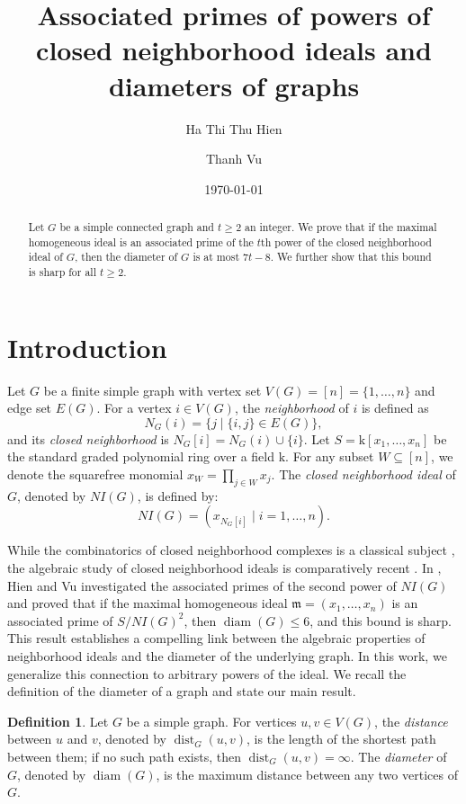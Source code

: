 \documentclass[12pt,reqno,twoside]{amsart}
\title{Associated primes of powers of closed neighborhood ideals and diameters of graphs}
\author{Ha Thi Thu Hien}
\author{Thanh Vu}
\date{\today}
\newcommand{\kk}{\mathrm k}
\theoremstyle{definition}
\newtheorem{defn}[thm]{\bf Definition}
\theoremstyle{plain}
\theoremstyle{remark}
\numberwithin{equation}{section}
\begin{document}
\begin{abstract} Let $G$ be a simple connected graph and $t \ge 2$ an integer. We prove that if the maximal homogeneous ideal is an associated prime of the $t$th power of the closed neighborhood ideal of $G$, then the diameter of $G$ is at most $7t - 8$. We further show that this bound is sharp for all $t \ge 2$.
\end{abstract}

\maketitle

\section{Introduction} 
Let $G$ be a finite simple graph with vertex set $V(G) = [n] = \{1, \ldots, n\}$ and edge set $E(G)$. For a vertex $i \in V(G)$, the \emph{neighborhood} of $i$ is defined as 
\[
N_G(i) = \{ j \mid \{i, j\} \in E(G) \},
\]
and its \emph{closed neighborhood} is $N_G[i] = N_G(i) \cup \{i\}$. Let $S = \kk[x_1, \ldots, x_n]$ be the standard graded polynomial ring over a field $\kk$. For any subset $W \subseteq [n]$, we denote the squarefree monomial $x_W = \prod_{j \in W} x_j$. The \emph{closed neighborhood ideal} of $G$, denoted by $NI(G)$, is defined by:
\[
NI(G) = ( x_{N_G[i]} \mid i = 1, \ldots, n ).
\]

While the combinatorics of closed neighborhood complexes is a classical subject \cite{B, L}, the algebraic study of closed neighborhood ideals is comparatively recent \cite{CJRS, SM, HS, NBR, NQ, NQBM}. In \cite{HV}, Hien and Vu investigated the associated primes of the second power of $NI(G)$ and  proved that if the maximal homogeneous ideal $\mathfrak{m} = (x_1, \ldots, x_n)$ is an associated prime of $S/NI(G)^2$, then $\operatorname{diam}(G) \le 6$, and this bound is sharp. This result establishes a compelling link between the algebraic properties of neighborhood ideals and the diameter of the underlying graph. In this work, we generalize this connection to arbitrary powers of the ideal. We recall the definition of the diameter of a graph and state our main result.


\begin{defn}
Let $G$ be a simple graph. For vertices $u, v \in V(G)$, the \emph{distance} between $u$ and $v$, denoted by $\operatorname{dist}_G(u, v)$, is the length of the shortest path between them; if no such path exists, then $\operatorname{dist}_G(u, v) = \infty$. The \emph{diameter} of $G$, denoted by $\operatorname{diam}(G)$, is the maximum distance between any two vertices of $G$.
\end{defn}
\end{document}
